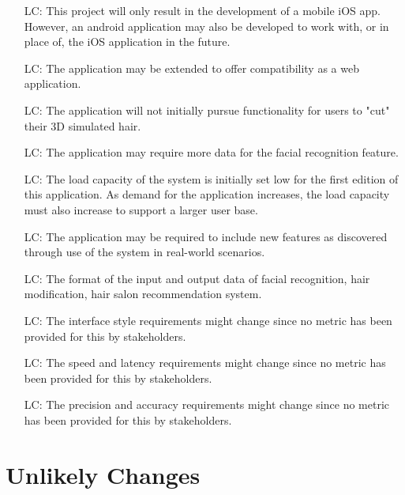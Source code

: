 \documentclass[12pt]{article}
\newcounter{lcnum} %
\begin{document}
\noindent \begin{itemize}

\item[LC\refstepcounter{lcnum}\thelcnum\label{LC_meaningfulLabel}:] 
This project will only result in the development of a mobile iOS app. However, an android application may also be developed to work with, or in place of, the iOS application in the future.
\item[LC\refstepcounter{lcnum}\thelcnum\label{LC_meaningfulLabel}:] 
The application may be extended to offer compatibility as a web application.
\item[LC\refstepcounter{lcnum}\thelcnum\label{LC_meaningfulLabel}:] 
The application will not initially pursue functionality for users to "cut" their 3D simulated hair.
\item[LC\refstepcounter{lcnum}\thelcnum\label{LC_meaningfulLabel}:] 
The application may require more data for the facial recognition feature.
\item[LC\refstepcounter{lcnum}\thelcnum\label{LC_meaningfulLabel}:] 
The load capacity of the system is initially set low for the first edition of this application. As demand for the application increases, the load capacity must also increase to support a larger user base.
\item[LC\refstepcounter{lcnum}\thelcnum\label{LC_meaningfulLabel}:] 
The application may be required to include new features as discovered through use of the system in real-world scenarios.
\item[LC\refstepcounter{lcnum}\thelcnum\label{LC_meaningfulLabel}:] 
The format of the
input and output data of facial recognition, hair modification, hair salon recommendation system.
\item[LC\refstepcounter{lcnum}\thelcnum\label{LC_meaningfulLabel}:] 
The interface style requirements might change since no metric has been provided for this by stakeholders. 
\item[LC\refstepcounter{lcnum}\thelcnum\label{LC_meaningfulLabel}:] 
The speed and latency requirements might change since no metric has been provided for this by stakeholders. 
\item[LC\refstepcounter{lcnum}\thelcnum\label{LC_meaningfulLabel}:] 
The precision and accuracy requirements might change since no metric has been provided for this by stakeholders. 




\end{itemize}

\section{Unlikely Changes}    
\end{document}
